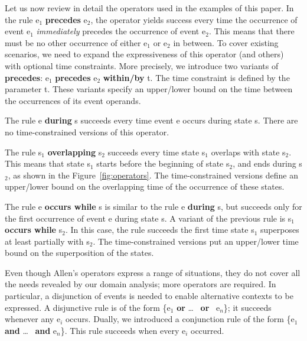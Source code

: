 Let us now review in detail the operators used in the examples of this paper. In the rule {\ttfamily e$_1$ {\bf precedes} e$_2$}, the operator yields success every time the occurrence of event {\ttfamily e$_1$} {\em immediately} precedes the occurrence of event {\ttfamily e$_2$}. This means that there must be no other occurrence of either {\ttfamily e$_1$} or {\ttfamily e$_2$} in between. To cover existing scenarios, we need to expand the expressiveness of this operator (and others) with optional time constraints. More precisely, we introduce two variants of {\ttfamily \bf precedes}: {\ttfamily e$_1$ {\bf precedes} e$_2$ {\bf within/by} t}. The time constraint is defined by the parameter {\ttfamily t}. These variants specify an upper/lower bound on the time between the occurrences of its event operands.


The rule {\ttfamily e {\bf during} s} succeeds every time event {\ttfamily e} occurs during state {\ttfamily s}. There are no time-constrained versions of this operator.

The rule {\ttfamily s$_1$ {\bf overlapping} s$_2$} succeeds every time state {\ttfamily s$_1$} overlaps with state {\ttfamily s$_2$}.  This means that state {\ttfamily s$_1$} starts before the beginning of state {\ttfamily s$_2$}, and ends during {\ttfamily s$_2$}, as shown in the Figure~\ref{fig:operators}.  The time-constrained versions define an upper/lower bound on the overlapping time of the occurrence of these states.

The rule {\ttfamily e {\bf occurs while} s} is similar to the rule {\ttfamily e {\bf during} s}, but succeeds only for the first occurrence of event {\ttfamily e} during state {\ttfamily s}. A variant of the previous rule is {\ttfamily s$_1$ {\bf occurs while} s$_2$}. In this case, the rule succeeds the first time state {\ttfamily s$_1$} superposes at least partially with {\ttfamily s$_2$}. The time-constrained versions put an upper/lower time bound on the superposition of the states.

Even though Allen's operators express a range of situations, they do not cover all the needs revealed by our domain analysis; more operators are required. In particular, a disjunction of events is needed to enable alternative contexts to be expressed. A disjunctive rule is of the form {\ttfamily \{e$_1$ {\bf or} \ldots~ {\bf or}~ e$_n$\}}; it succeeds whenever any {\ttfamily e$_i$} occurs. Dually, we introduced a conjunction rule of the form {\ttfamily \{e$_1$ {\bf and} \ldots~ {\bf and} e$_n$\}}. This rule succeeds when every {\ttfamily e$_i$} occurred. 

